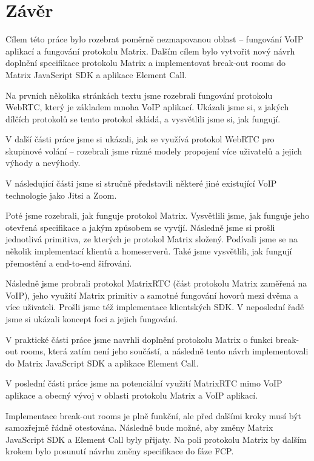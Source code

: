 \section{Závěr}

Cílem této práce bylo rozebrat poměrně nezmapovanou oblast -- fungování VoIP
aplikací a fungování protokolu Matrix. Dalším cílem bylo vytvořit nový návrh
doplnění specifikace protokolu Matrix a implementovat break-out rooms do Matrix
JavaScript SDK a aplikace Element Call.

Na prvních několika stránkách textu jsme rozebrali fungování protokolu WebRTC,
který je základem mnoha VoIP aplikací. Ukázali jsme si, z jakých dílčích
protokolů se tento protokol skládá, a vysvětlili jsme si, jak fungují.

V další části práce jsme si ukázali, jak se využívá protokol WebRTC pro
skupinové volání -- rozebrali jsme různé modely propojení více uživatelů a
jejich výhody a nevýhody.

V následující části jsme si stručně představili některé jiné existující VoIP
technologie jako Jitsi a Zoom.

Poté jsme rozebrali, jak funguje protokol Matrix. Vysvětlili jsme, jak funguje
jeho otevřená specifikace a jakým způsobem se vyvíjí. Následně jsme si prošli
jednotlivá primitiva, ze kterých je protokol Matrix složený. Podívali jsme se na
několik implementací klientů a homeserverů. Také jsme vysvětlili, jak fungují
přemostění a end-to-end šifrování.

Následně jsme probrali protokol MatrixRTC (část protokolu Matrix zaměřená na
VoIP), jeho využití Matrix primitiv a samotné fungování hovorů mezi dvěma a více
uživateli. Prošli jsme též implementace klientských SDK. V neposlední řadě jsme
si ukázali koncept foci a jejich fungování.

V praktické části práce jsme navrhli doplnění protokolu Matrix o funkci
break-out rooms, která zatím není jeho součástí, a následně tento návrh
implementovali do Matrix JavaScript SDK a aplikace Element Call.

V poslední části práce jsme na potenciální využití MatrixRTC mimo VoIP aplikace
a obecný vývoj v oblasti protokolu Matrix a VoIP aplikací.

Implementace break-out rooms je plně funkční, ale před dalšími kroky musí být
samozřejmě řádně otestována. Následně bude možné, aby změny Matrix JavaScript
SDK a Element Call byly přijaty. Na poli protokolu Matrix  by dalším krokem bylo
posunutí návrhu změny specifikace do fáze FCP.
